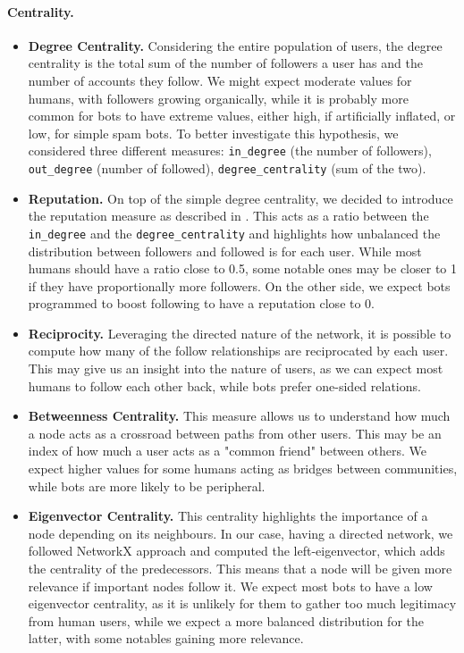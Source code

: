 \documentclass[12pt, a4paper]{article}
\begin{document}
		\paragraph{Centrality.}
		\begin{itemize}
			\item \textbf{Degree Centrality.} Considering the entire population of users, the degree centrality is the total sum of the number of followers a user has and the number of accounts they follow. We might expect moderate values for humans, with followers growing organically, while it is probably more common for bots to have extreme values, either high, if artificially inflated, or low, for simple spam bots. To better investigate this hypothesis, we considered three different measures: \texttt{in\_degree} (the number of followers), \texttt{out\_degree} (number of followed), \texttt{degree\_centrality} (sum of the two).
			\item \textbf{Reputation.} On top of the simple degree centrality, we decided to introduce the reputation measure as described in \cite{wang2010}. This acts as a ratio between the \texttt{in\_degree} and the \texttt{degree\_centrality} and highlights how unbalanced the distribution between followers and followed is for each user. While most humans should have a ratio close to 0.5, some notable ones may be closer to 1 if they have proportionally more followers. On the other side, we expect bots programmed to boost following to have a reputation close to 0.
			\item \textbf{Reciprocity.} Leveraging the directed nature of the network, it is possible to compute how many of the follow relationships are reciprocated by each user. This may give us an insight into the nature of users, as we can expect most humans to follow each other back, while bots prefer one-sided relations.
			\item \textbf{Betweenness Centrality.} This measure allows us to understand how much a node acts as a crossroad between paths from other users. This may be an index of how much a user acts as a "common friend" between others. We expect higher values for some humans acting as bridges between communities, while bots are more likely to be peripheral.
			\item \textbf{Eigenvector Centrality.} This centrality highlights the importance of a node depending on its neighbours. In our case, having a directed network, we followed NetworkX approach and computed the left-eigenvector, which adds the centrality of the predecessors. This means that a node will be given more relevance if important nodes follow it. We expect most bots to have a low eigenvector centrality, as it is unlikely for them to gather too much legitimacy from human users, while we expect a more balanced distribution for the latter, with some notables gaining more relevance.

\end{itemize}
\end{document}
